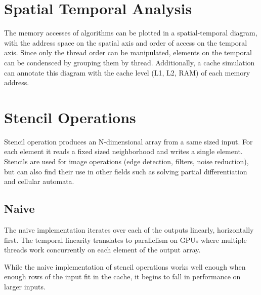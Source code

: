 
\section{Spatial Temporal Analysis}
The memory accesses of algorithms can be plotted in a spatial-temporal diagram, with the address space on the spatial axis and order of access on the temporal axis.
Since only the thread order can be manipulated, elements on the temporal can be condensced by grouping them by thread.
Additionally, a cache simulation can annotate this diagram with the cache level (L1, L2, RAM) of each memory address.


\section{Stencil Operations}

Stencil operation produces an N-dimensional array from a same sized input.
For each element it reads a fixed sized neighborhood and writes a single element.
Stencils are used for image operations (edge detection, filters, noise reduction), but can also find their use in other fields such as solving partial differentiation\cite{roth1997compilingstencils} and cellular automata.

\subsection{Naive}
\label{sec:stencil_naive}
The naive implementation iterates over each of the outputs linearly, horizontally first.
The temporal linearity translates to parallelism on GPUs where multiple threads work concurrently on each element of the output array.

While the naive implementation of stencil operations works well enough when enough rows of the input fit in the cache, it begins to fall in performance on larger inputs.


